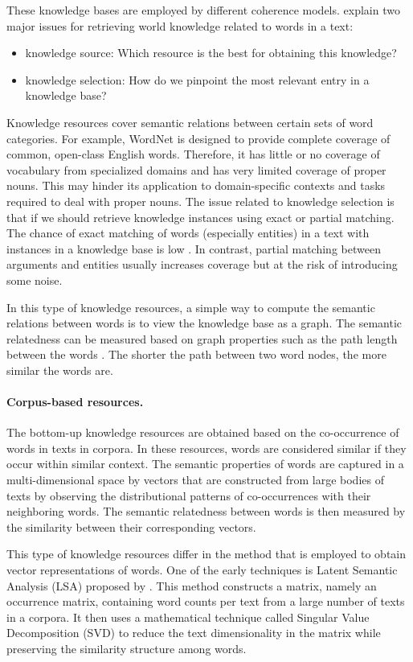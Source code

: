 These knowledge bases are employed by different coherence models.  
 explain two major issues for retrieving world knowledge related to words in a text: 
\begin{itemize}
\item knowledge source: Which resource is the best for obtaining this knowledge? 
\item knowledge selection: How do we pinpoint the most relevant entry in a knowledge base?
\end{itemize}
Knowledge resources cover semantic relations between certain sets of word categories.  
For example, WordNet is designed to provide complete coverage of common, open-class English words. 
Therefore, it has little or no coverage of vocabulary from specialized domains and has very limited coverage of proper nouns. 
This may hinder its application to domain-specific contexts and tasks required to deal with proper nouns. 
The issue related to knowledge selection is that if we should retrieve knowledge instances using exact or partial matching. 
The chance of exact matching of words (especially entities) in a text with instances in a knowledge base is low \cite{zhangmuyu15}. 
In contrast, partial matching between arguments and entities usually increases coverage but at the risk of introducing some noise. 

In this type of knowledge resources, a simple way to compute the semantic relations between words is to view the knowledge base as a graph. 
The semantic relatedness can be measured based on graph properties such as the path length between the words \cite{budanitsky06}. 
The shorter the path between two word nodes, the more similar the words are. 

\paragraph{Corpus-based resources.} 
The bottom-up knowledge resources are obtained based on the co-occurrence of words in texts in corpora. 
In these resources, words are considered similar if they occur within similar context. 
The semantic properties of words are captured in a \mbox{multi-dimensional} space by vectors that are constructed from large bodies of texts by observing the distributional patterns of co-occurrences with their neighboring words. 
The semantic relatedness between words is then measured by the similarity between their corresponding vectors. 

This type of knowledge resources differ in the method that is employed to obtain vector representations of words. 
One of the early techniques is Latent Semantic Analysis (LSA) proposed by . 
This method constructs a matrix, namely an occurrence matrix, containing word counts per text from a large number of texts in a corpora.  
It then uses a mathematical technique called Singular Value Decomposition (SVD) \cite{furnas88} to reduce the text dimensionality in the matrix while preserving the similarity structure among words. 

